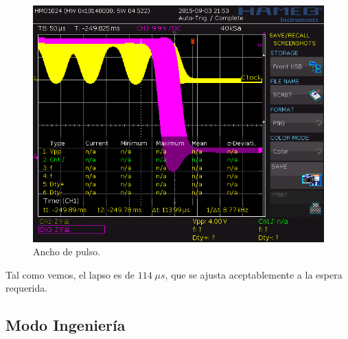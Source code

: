 \smallskip

\begin{figure}[H]
	\noindent \begin{centering}
		\includegraphics[width=\linewidth*2/3]{capitulo6/osc_pulso}
		\par\end{centering}
	\smallskip
	\caption{\label{fig:osc_pulso} Ancho de pulso.}
\end{figure} 

\smallskip

Tal como vemos, el lapso es de $114 \; \mu s$, que se ajusta aceptablemente a la espera requerida. 






\subsection{Modo Ingeniería}

